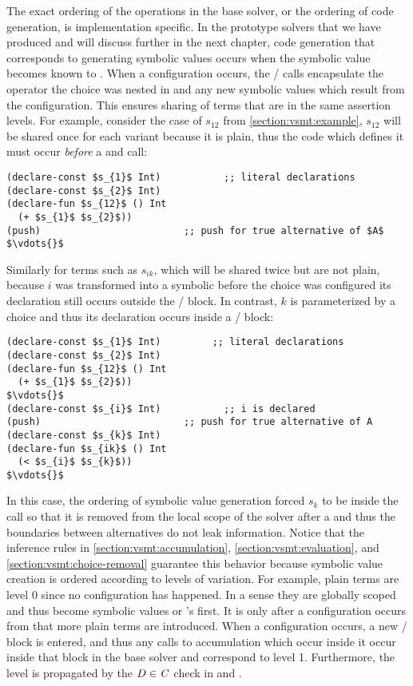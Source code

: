 The exact ordering of the operations in the base solver, or the ordering of code
generation, is implementation specific. In the prototype solvers that we have
produced and will discuss further in the next chapter, code generation that
corresponds to generating symbolic values occurs when the symbolic value becomes
known to \aStore. When a configuration occurs, the / calls
encapsulate the operator the choice was nested in and any new symbolic values
which result from the configuration. This ensures sharing of terms that are in
the same assertion levels. For example, consider the case of $s_{12}$ from
\autoref{section:vsmt:example}, $s_{12}$ will be shared once for each variant
because it is plain, thus the code which defines it must occur \emph{before} a
 and  call:
%
\begin{lstlisting}[columns=flexible,keepspaces=true,language=SMTLIB]
(declare-const $s_{1}$ Int)           ;; literal declarations
(declare-const $s_{2}$ Int)
(declare-fun $s_{12}$ () Int
  (+ $s_{1}$ $s_{2}$))
(push)                         ;; push for true alternative of $A$
$\vdots{}$
\end{lstlisting}
%
Similarly for terms such as $s_{ik}$, which will be shared twice but are not
plain, because $i$ was transformed into a symbolic before the choice was
configured its declaration still occurs outside the / block. In
contrast, $k$ is parameterized by a choice and thus its declaration occurs
inside a / block:
%
\begin{lstlisting}[columns=flexible,keepspaces=true,language=SMTLIB,breaklines=true]
(declare-const $s_{1}$ Int)         ;; literal declarations
(declare-const $s_{2}$ Int)
(declare-fun $s_{12}$ () Int
  (+ $s_{1}$ $s_{2}$))
$\vdots{}$
(declare-const $s_{i}$ Int)           ;; i is declared
(push)                         ;; push for true alternative of A
(declare-const $s_{k}$ Int)
(declare-fun $s_{ik}$ () Int
  (< $s_{i}$ $s_{k}$))
$\vdots{}$
\end{lstlisting}
%
In this case, the ordering of symbolic value generation forced $s_{k}$ to be
inside the  call so that it is removed from the local scope of the
solver after a  and thus the boundaries between alternatives do not leak
information. Notice that the inference rules in
\autoref{section:vsmt:accumulation}, \autoref{section:vsmt:evaluation}, and
\autoref{section:vsmt:choice-removal} guarantee this behavior because symbolic
value creation is ordered according to levels of variation. For example, plain
terms are level 0 since no configuration has happened. In a sense they are
globally scoped and thus become symbolic values or \unit{}'s first. It is only
after a configuration occurs from \crChc{} that more plain terms are introduced.
When a configuration occurs, a new / block is entered, and thus
any calls to accumulation which occur inside it occur inside that block in the
base solver and correspond to level 1. Furthermore, the level is propagated by
the $D \in \mathit{C}$ check in \crChcT{} and \crChcF{}.

